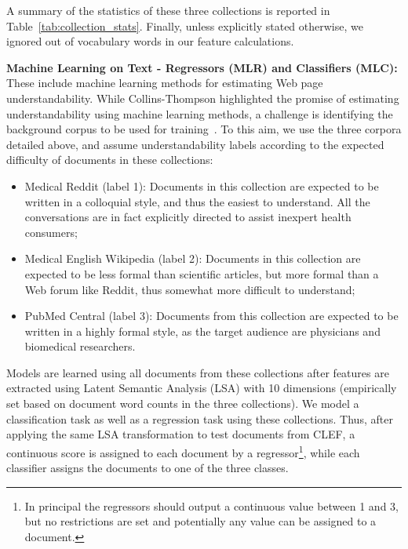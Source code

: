 A summary of the statistics of these three collections is reported in Table~\ref{tab:collection_stats}. 
Finally, unless explicitly stated otherwise, we ignored out of vocabulary words in our feature calculations.






\textbf{Machine Learning on Text - Regressors (MLR) and Classifiers (MLC):} These include machine learning methods for estimating Web page understandability. While Collins-Thompson highlighted the promise of estimating understandability using machine learning methods, a challenge is identifying the background corpus to be used for training~\cite{collins2014computational}. To this aim, we use the three corpora detailed above, and assume understandability labels according to the expected difficulty of documents in these collections:

\begin{itemize}[leftmargin=*]
    \item Medical Reddit (label 1): Documents in this collection are expected to be written in a colloquial style, and thus the easiest to understand. All the conversations are in fact explicitly directed to assist inexpert health consumers;
    \item Medical English Wikipedia (label 2): Documents in this collection are expected to be less formal than scientific articles, but more formal than a Web forum like Reddit, thus somewhat more difficult to understand;
    \item PubMed Central (label 3): Documents from this collection are expected to be written in a highly formal style, as the target audience are physicians and biomedical researchers.
\end{itemize}

Models are learned using all documents from these collections after features are extracted using Latent Semantic Analysis (LSA) with 10 dimensions (empirically set based on document word counts in the three collections). We model a classification task as well as a regression task using these collections. Thus, after applying the same LSA transformation to test documents from CLEF, a continuous score is assigned to each document by a regressor\footnote{In principal the regressors should output a continuous value between 1 and 3, but no restrictions are set and potentially any value can be assigned to a document.}, while each classifier assigns the documents to one of the three classes.

